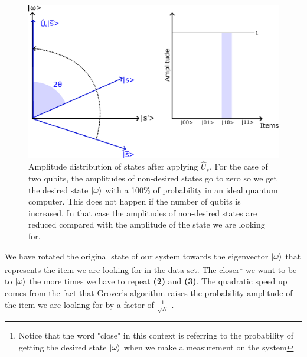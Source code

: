 \begin{figure}[H]
    \centering
    \includegraphics[scale=0.55]{Figures/Grover_Step3.pdf}
    \caption{Amplitude distribution of states after applying $\hat{U}_{s}$. For the case of two qubits, the amplitudes of non-desired states go to zero so we get the desired state $\ket{\omega}$ with a 100\% of probability in an ideal quantum computer. This does not happen if the number of qubits is increased. In that case the amplitudes of non-desired states are reduced compared with the amplitude of the state we are looking for.}
    \label{fig:Grover_step3}
\end{figure}

We have rotated the original state of our system towards the eigenvector $\ket{\omega}$ that represents the item we are looking for in the data-set. The closer\footnote{Notice that the word "close" in this context is referring to the probability of getting the desired state $\ket{\omega}$ when we make a measurement on the system} we want to be to $\ket{\omega}$ the more times we have to repeat \textbf{(2)} and \textbf{(3)}. The quadratic speed up comes from the fact that Grover's algorithm raises the probability amplitude of the item we are looking for by a factor of $\frac{1}{\sqrt{N}}$ .



